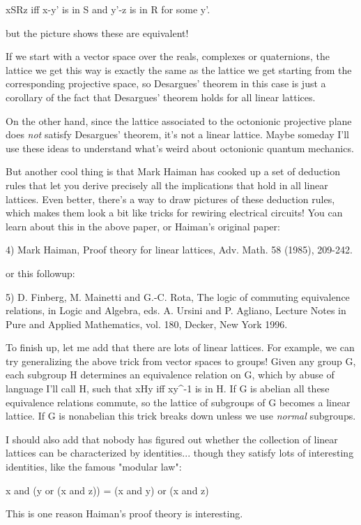 xSRz iff x-y' is in S and y'-z is in R for some y'.

but the picture shows these are equivalent!

If we start with a vector space over the reals, complexes or
quaternions, the lattice we get this way is exactly the same as the
lattice we get starting from the corresponding projective space, so
Desargues' theorem in this case is just a corollary of the fact that
Desargues' theorem holds for all linear lattices.

On the other hand, since the lattice associated to the octonionic
projective plane does \emph{not} satisfy  Desargues' theorem, it's not a
linear lattice.   Maybe someday I'll use these ideas to understand
what's weird about octonionic quantum mechanics.  

But another cool thing is that Mark Haiman has cooked up a set of
deduction rules that let you derive precisely all the implications that
hold in all linear lattices.  Even better, there's a way to draw
pictures of these deduction rules, which makes them look a bit like
tricks for rewiring electrical circuits!  You can learn about this in
the above paper, or Haiman's original paper:

4) Mark Haiman, Proof theory for linear lattices, Adv. Math. 58 (1985),
209-242.

or this followup:

5) D. Finberg, M. Mainetti and G.-C. Rota, The logic of commuting
equivalence relations, in Logic and Algebra, eds. A. Ursini and P. 
Agliano, Lecture Notes in Pure and Applied Mathematics, vol. 180,
Decker, New York 1996.

To finish up, let me add that there are lots of linear lattices.  For
example, we can try generalizing the above trick from vector spaces to
groups!  Given any group G, each subgroup H determines an equivalence 
relation on G, which by abuse of language I'll call H, such that xHy iff
xy^{-1} is in H.  If G is abelian all these equivalence relations
commute, so the lattice of subgroups of G becomes a linear lattice.  If
G is nonabelian this trick breaks down unless we use \emph{normal} 
subgroups.

I should also add that nobody has figured out whether the collection
of linear lattices can be characterized by identities... though they
satisfy lots of interesting identities, like the famous "modular law":

x and (y or (x and z)) = (x and y) or (x and z)

This is one reason Haiman's proof theory is interesting.

